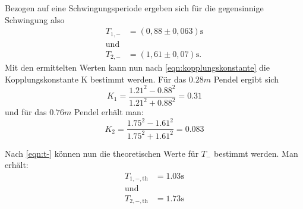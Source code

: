 \noindent Bezogen auf eine Schwingungsperiode ergeben sich für die gegensinnige Schwingung also
\begin{align}
  T_{1,-}&=(0,88 \pm 0,063) \si{\second}\\
  \text{und}& \nonumber\\
  T_{2,-}&=(1,61 \pm 0,07) \si{\second} \text{.}
\end{align}
\noindent
Mit den ermittelten Werten kann nun nach \autoref{eqn:kopplungskonstante} die Kopplungskonstante K bestimmt werden.
Für das $0.28m$ Pendel ergibt sich
\begin{equation}
  K_1=\frac{1.21^2-0.88^2}{1.21^2+0.88^2}=0.31
\end{equation}
\noindent
und für das $0.76m$ Pendel erhält man:
\begin{equation}
  K_2=\frac{1.75^2-1.61^2}{1.75^2+1.61^2}=0.083
\end{equation}

\noindent Nach \autoref{eqn:t-} können nun die theoretischen Werte für $T_-$ bestimmt werden. Man erhält:
\begin{align}
  T_{1,-,\text{th}}&=1.03 \si{\second}\\
  \text{und}& \nonumber\\
  T_{2,-,\text{th}}&=1.73 \si{\second} 
\end{align}

